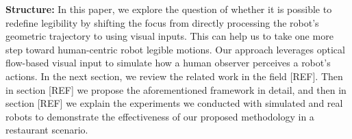 
\vspace{0.3cm}
\textbf{Structure:}
In this paper, we explore the question of whether it is possible to redefine legibility by shifting the focus from directly processing the robot's geometric trajectory to using visual inputs.
This can help us to take one more step toward human-centric robot legible motions.
Our approach leverages optical flow-based visual input to simulate how a human observer perceives a robot’s actions. 
%
In the next section, we review the related work in the field [REF].
Then in section [REF] we propose the aforementioned framework in detail,
and then in section [REF] we explain the experiments we conducted with simulated and real robots to demonstrate the effectiveness of our proposed methodology in a restaurant scenario.


